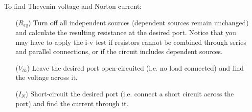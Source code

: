 \documentclass[twocolumn]{article}
\begin{document}
To find Thevenin voltage and Norton current:
\begin{itemize}
    \item[($R_{eq}$)] Turn off all independent sources (dependent
    sources remain unchanged) and calculate the resulting resistance at the
    desired port. Notice that you may have to apply the i-v test if resistors
    cannot be combined through series and parallel connections, or if the
    circuit includes dependent sources.
    \item[($V_{th}$)] Leave the desired port open-circuited
    (i.e. no load connected) and find the voltage across it.
    \item[($I_N$)] Short-circuit the desired port (i.e. connect
    a short circuit across the port) and find the current through it. 
\end{itemize}
\end{document}
